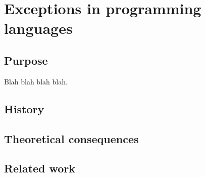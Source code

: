 \chapter{Exceptions in programming languages}

\section{Purpose}

Blah blah blah blah. \cite{swierstra:thesis}

\section{History}

\section{Theoretical consequences}

\section{Related work}
